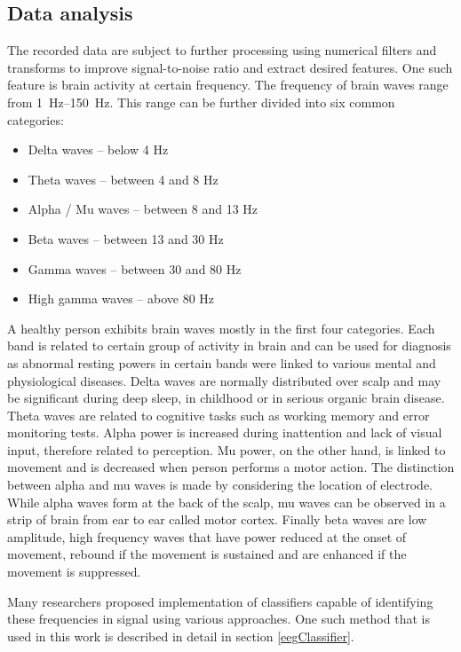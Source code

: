 \subsection{Data analysis} \label{sub:dataAnalysis}
The recorded data are subject to further processing using numerical filters and
transforms to improve signal-to-noise ratio and extract desired features. 
One such feature is brain activity at certain frequency. The frequency of brain
waves range from \SIrange{1}{150}{\Hz}. This range can be further divided
into six common categories\cite{dominantF}:
\begin{itemize}
  \item Delta waves -- below 4 Hz
  \item Theta waves -- between 4 and 8 Hz
  \item Alpha / Mu waves -- between 8 and 13 Hz
  \item Beta waves -- between 13 and 30 Hz
  \item Gamma waves -- between 30 and 80 Hz
  \item High gamma waves -- above 80 Hz
\end{itemize}
A healthy person exhibits brain waves mostly in the first four categories. Each
band is related to certain group of activity in brain and can be used for
diagnosis as abnormal resting powers in certain bands were linked to various
mental and physiological diseases. \cite{dominantF} Delta waves are normally
distributed over scalp and may be significant during deep sleep, in childhood or
in serious organic brain disease. \cite{eegClass} Theta waves are related to
cognitive tasks such as working memory and error monitoring tests. Alpha power
is increased during inattention and lack of visual input, therefore related to
perception. Mu power, on the other hand, is linked to movement and is decreased
when person performs a motor action. The distinction between alpha and mu waves
is made by considering the location of electrode. While alpha waves form at the
back of the scalp, mu waves can be observed in a strip of brain from ear to ear
called motor cortex. Finally beta waves are low amplitude, high frequency waves
that have power reduced at the onset of movement, rebound if the movement is
sustained and are enhanced if the movement is suppressed. \cite{dominantF}

Many researchers proposed implementation of classifiers capable of identifying
these frequencies in signal using various approaches. One such method that is
used in this work is described in detail in section \ref{eegClassifier}.

